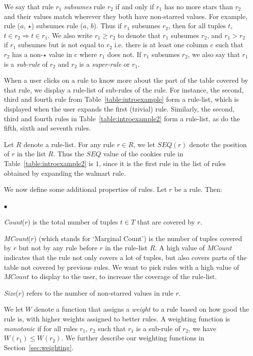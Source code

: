 \documentclass{sig-alternate}
\newcommand{\squishlist}{
   \begin{list}{$\bullet$}
    { \setlength{\itemsep}{0pt}
      \setlength{\parsep}{2pt}
      \setlength{\topsep}{2pt}
      \setlength{\partopsep}{0pt}
    }
}
\newcommand{\squishend}{\end{list}}
\begin{document}
We say that rule $r_1$ {\em subsumes} rule $r_2$ if and only if $r_1$ has no more stars than $r_2$ and their values match wherever they both have non-starred values. For example, rule ($a$, $\star$) subsumes rule ($a$, $b$). Thus if $r_1$ subsumes $r_2$, then for all tuples $t$, $t \in r_2 \Rightarrow t \in r_1$. We also write $r_1 \geq r_2$ to denote that $r_1$ subsumes $r_2$, and $r_1 > r_2$ if $r_1$ subsumes but is not equal to $r_2$ i.e. there is at least one column $c$ such that $r_2$ has a non-$\star$ value in $c$ where $r_1$ does not. If $r_1$ subsumes $r_2$, we also say that $r_1$ is a {\em sub-rule} of $r_2$ and $r_2$ is a {\em super-rule} or $r_1$.

When a user clicks on a rule to know more about the part of the table covered by that rule, we display a rule-list of sub-rules of the rule.
For instance, the second, third and fourth rule from Table~\ref{table:introexample} form a rule-list, which is displayed when the user expands the first (trivial) rule. Similarly, the second, third and fourth rules in Table~\ref{table:introexample2} form a rule-list, as do the fifth, sixth and seventh rules. 

Let $R$ denote a rule-list. For any rule $r \in R$, we let $SEQ(r)$ denote the position of $r$ in the list $R$. 
Thus the $SEQ$ value of the cookies rule in Table~\ref{table:introexample2} is $1$, since it is the first rule in the list of rules obtained by expanding the walmart rule. 

We now define some additional properties of rules. Let $r$ be a rule. Then:
\squishlist
\item {\em Count}($r$) is the total number of tuples $t \in T$ that are covered by $r$. 
\item {\em MCount}($r$) (which stands for `Marginal Count') is the number of tuples covered by $r$ but not by any rule before $r$ in the rule-list $R$. A high value of $MCount$ indicates that the rule not only covers a lot of tuples, but also covers parts of the table not covered by previous rules. We want to pick rules with a high value of $MCount$ to display to the user, to increase the coverage of the rule-list. 
\item {\em Size}($r$) refers to the number of non-starred values in rule $r$. 
\item We let $W$ denote a function that assigns a {\em weight} to a rule based on how good the rule is, with higher weights assigned to better rules. A weighting function is {\em monotonic} if for all rules $r_1$, $r_2$ such that $r_1$ is a sub-rule of $r_2$, we have $W(r_1) \leq W(r_2)$. We further describe our weighting functions in Section~\ref{sec:weighting}. 
\squishend
\end{document}
